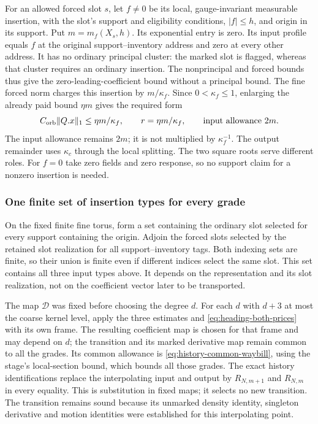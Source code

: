 For an allowed forced slot $s$, let $f\ne0$ be its local,
gauge-invariant measurable insertion, with the slot's support
and eligibility conditions, $|f|\le h$, and origin in its support.
Put $m=m_f(X_s,h)$. Its exponential entry is zero. Its input
profile equals $f$ at the original support--inventory address
and zero at every other address. It has no ordinary principal
cluster: the marked slot is flagged, whereas that cluster requires
an ordinary insertion. The nonprincipal and forced bounds thus
give the zero-leading-coefficient bound without a principal bound.
The fine forced norm charges this insertion by $m/\kappa_f$.
Since $0<\kappa_f\le1$, enlarging the already paid bound
$\eta m$ gives the required form
\begin{equation}\label{eq:history-forced-price}
 C_{\rm orb}\|Q.x\|_1\le\eta m/\kappa_f,
 \qquad r=\eta m/\kappa_f,
 \qquad\text{input allowance }2m.
\end{equation}
The input allowance remains $2m$; it is not multiplied by
$\kappa_f^{-1}$. The output remainder uses $\kappa_c$ through
the local splitting. The two square roots serve different roles.
For $f=0$ take zero fields and zero response, so no support
claim for a nonzero insertion is needed.

\subsubsection{One finite set of insertion types for every grade}
On the fixed finite fine torus, form a set containing the ordinary
slot selected for every support containing the origin. Adjoin the
forced slots selected by the retained slot realization for all
support--inventory tags. Both indexing sets are finite, so their
union is finite even if different indices select the same slot.
This set contains all three input types above. It depends on the
representation and its slot realization, not on the coefficient
vector later to be transported.

The map $\mathcal D$ was fixed before choosing the degree $d$.
For each $d$ with $d+3$ at most the coarse kernel level, apply the
three estimates and \eqref{eq:heading-both-prices} with its own
frame. The resulting coefficient map is chosen for that frame and may depend
on $d$; the transition and its marked derivative map remain common
to all the grades. Its common allowance is \eqref{eq:history-common-waybill},
using the stage's local-section bound, which bounds all those
grades. The exact history identifications replace the interpolating
input and output by $R_{N,m+1}$ and $R_{N,m}$ in every equality.
This is substitution in fixed maps; it selects no new transition.
The transition remains sound because its unmarked density identity,
singleton derivative and motion identities were established for
this interpolating point.

